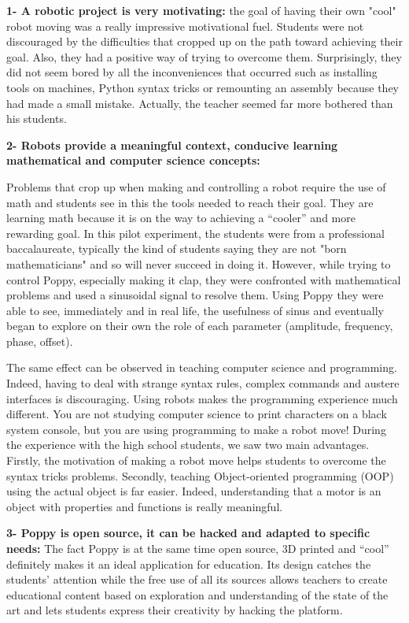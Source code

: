 \textbf{1- A robotic project is very motivating:} the goal of having their own "cool" robot moving was a really impressive motivational fuel. Students were not discouraged by the difficulties that cropped up on the path toward achieving their goal. Also, they had a positive way of trying to overcome them. Surprisingly, they did not seem bored by all the inconveniences that occurred such as installing tools on machines, Python syntax tricks or remounting an assembly because they had made a small mistake. Actually, the teacher seemed far more bothered than his students.

\textbf{2- Robots provide a meaningful context, conducive learning mathematical and computer science concepts:}

Problems that crop up when making and controlling a robot require the use of math and students see in this the tools needed to reach their goal. They are learning math because it is on the way to achieving a “cooler” and more rewarding goal. In this pilot experiment, the students were from a professional baccalaureate, typically the kind of students saying they are not "born mathematicians" and so will never succeed in doing it. However, while trying to control Poppy, especially making it clap, they were confronted with mathematical problems and used a sinusoidal signal to resolve them. Using Poppy they were able to see, immediately and in real life, the usefulness of sinus and eventually began to explore on their own the role of each parameter (amplitude, frequency, phase, offset).

The same effect can be observed in teaching computer science and programming. Indeed, having to deal with strange syntax rules, complex commands and austere interfaces is discouraging. Using robots makes the programming experience much different. You are not studying computer science to print characters on a black system console, but you are using programming to make a robot move!
During the experience with the high school students, we saw two main advantages. Firstly, the motivation of making a robot move helps students to overcome the syntax tricks problems. Secondly, teaching Object-oriented programming (OOP) using the actual object is far easier. Indeed, understanding that a motor is an object with properties and functions is really meaningful.


\textbf{3- Poppy is open source, it can be hacked and adapted to specific needs:}
The fact Poppy is at the same time open source, 3D printed and “cool” definitely makes it  an ideal application for education. Its design catches the students’ attention while the free use of all its sources allows teachers to create educational content based on exploration and understanding of the state of the art and lets students express their creativity by hacking the platform.


